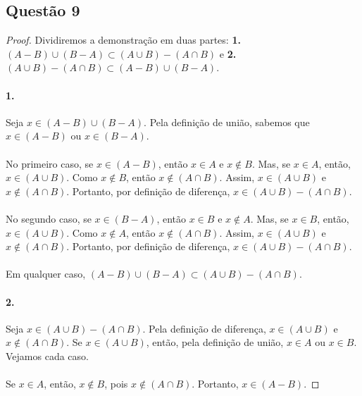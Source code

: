 \documentclass[11pt,a4paper]{report}
\begin{document}
    \subsection{Questão 9}
    \begin{proof}
    Dividiremos a demonstração em duas partes: \textbf{1.} $(A - B) \cup (B - A) \subset (A \cup B) - (A \cap B)$ e \textbf{2.} $(A \cup B) - (A \cap B) \subset (A - B) \cup (B - A)$.

    \paragraph{1.}
    Seja $x \in (A - B) \cup (B - A)$. Pela definição de união, sabemos que $x \in (A - B)$ ou $x \in (B - A)$. 
    
    \paragraph{}
    No primeiro caso, se $x \in (A - B)$, então $x \in A$ e $x \not\in B$. Mas, se $x \in A$, então, $x \in (A \cup B)$. Como $x \not\in B$, então $x \not\in (A \cap B)$. Assim, $x \in (A \cup B)$ e $x \not\in (A \cap B)$. Portanto, por definição de diferença, $x \in (A \cup B) - (A \cap B)$.

    \paragraph{}
    No segundo caso, se $x \in (B - A)$, então $x \in B$ e $x \not\in A$. Mas, se $x \in B$, então, $x \in (A \cup B)$. Como $x \not\in A$, então $x \not\in (A \cap B)$. Assim, $x \in (A \cup B)$ e $x \not\in (A \cap B)$. Portanto, por definição de diferença, $x \in (A \cup B) - (A \cap B)$.

    \paragraph{}
    Em qualquer caso, $(A - B) \cup (B - A) \subset (A \cup B) - (A \cap B)$.

    \paragraph{2.}
    Seja $x \in (A \cup B) - (A \cap B)$. Pela definição de diferença, $x \in (A \cup B)$ e $x \not\in (A \cap B)$. Se $x \in (A \cup B)$, então, pela definição de união, $x \in A $ ou $x \in B$. Vejamos cada caso.

    \paragraph{}
    Se $x \in A$, então, $x \not\in B$, pois $x \not\in (A \cap B)$. Portanto, $x \in (A - B)$. 
    

\end{proof}
\end{document}
